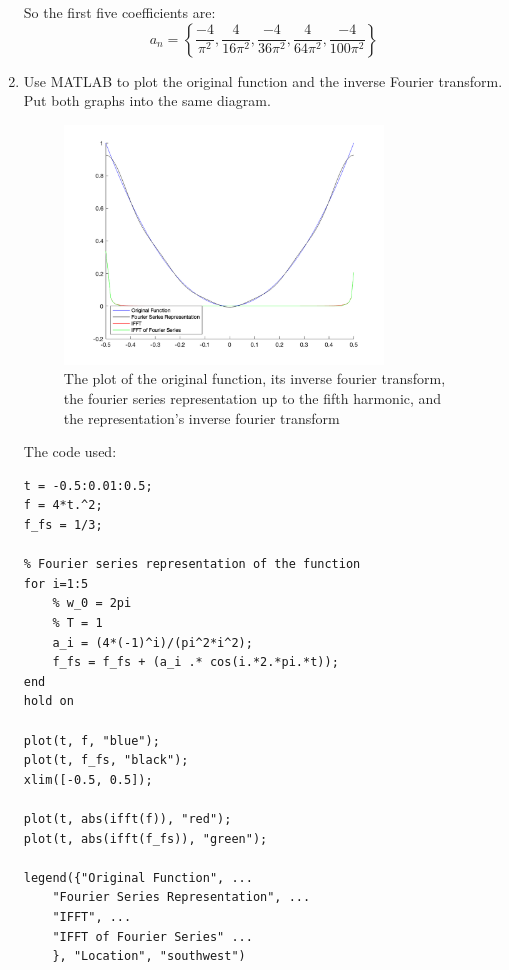\begin{enumerate}
          So the first five coefficients are:
          \begin{equation}
              a_n = \left\{ \frac{-4}{\pi^2}, \frac{4}{16\pi^2}, \frac{-4}{36\pi^2}, \frac{4}{64\pi^2}, \frac{-4}{100\pi^2} \right\}
          \end{equation}
    \item Use MATLAB to plot the original function and the inverse Fourier transform. Put both graphs into the same diagram.
          \begin{figure}[H]
              \centering
              \includegraphics[width=0.8\textwidth]{images/prelab_problem_2_plot.png}
              \caption{The plot of the original function, its inverse fourier transform, the fourier series representation up to the fifth harmonic, and the representation's inverse fourier transform}
          \end{figure}
          The code used:
          \begin{verbatim}
t = -0.5:0.01:0.5;
f = 4*t.^2;
f_fs = 1/3;

% Fourier series representation of the function
for i=1:5
    % w_0 = 2pi
    % T = 1
    a_i = (4*(-1)^i)/(pi^2*i^2);
    f_fs = f_fs + (a_i .* cos(i.*2.*pi.*t));
end
hold on

plot(t, f, "blue");
plot(t, f_fs, "black");
xlim([-0.5, 0.5]);

plot(t, abs(ifft(f)), "red");
plot(t, abs(ifft(f_fs)), "green");

legend({"Original Function", ...
    "Fourier Series Representation", ...
    "IFFT", ...
    "IFFT of Fourier Series" ...
    }, "Location", "southwest")
          \end{verbatim}
\end{enumerate}

